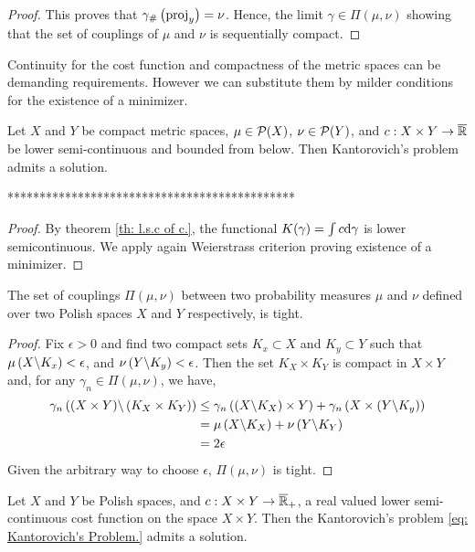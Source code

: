 \begin{theorem}
\begin{proof}
	This proves that ${\gamma}_{\#} \left( \mathrm{proj}_y \right)=\nu$. Hence, the limit $\gamma \in \Pi(\mu, \nu)$ showing that the set of couplings of $\mu$ and $\nu$ is sequentially compact. 
\end{proof}

Continuity for the cost function and compactness of the metric spaces can be demanding requirements. However we can substitute them by milder conditions for the existence of a minimizer. 

\begin{theorem}
	Let $X$ and $Y$ be compact metric spaces, $\mu \in \mathcal{P}(X)$, $\nu \in\mathcal{P}(Y)$, and $c:X\times Y\rightarrow \overline{\mathbb{R}} $  be lower semi-continuous and bounded from below. Then Kantorovich's problem admits a solution.
\end{theorem}
*********************************************
\begin{proof}
By theorem \ref{th: l.s.c of c.}, the functional $K(\gamma) =\int c\mathrm{d}\gamma$ is lower semicontinuous. We apply again Weierstrass criterion proving existence of a minimizer.
\end{proof}


\begin{lemma}
	The set of couplings $\Pi(\mu, \nu)$ between two probability measures $\mu$ and $\nu$ defined over two Polish spaces $X$ and $Y$ respectively, is tight.
\end{lemma}
\begin{proof}
Fix $\epsilon>0$ and find two compact sets $K_x\subset X$ and $K_y\subset Y$ such that $\mu\left( X\backslash K_x \right)<\epsilon$, and $\nu\left( Y\backslash K_y \right)<\epsilon$. Then the set $K_X\times K_Y$ is compact in $X\times Y$ and, for any $\gamma_n\in \Pi(\mu, \nu)$, we have,
\begin{align*}
\gamma_n\left( (X\times Y)\backslash \left( K_X\times K_Y \right) \right)&\leq \gamma_n\left( (X\backslash K_X)\times Y \right)+\gamma_n\left( X\times \left( Y\backslash K_y \right) \right)\\&=\mu\left( X\backslash K_X \right)+\nu\left( Y\backslash K_Y \right)\\&=2\epsilon
\end{align*}  
Given the arbitrary way to choose $\epsilon$, $\Pi(\mu,\nu)$ is tight.
\end{proof}

\begin{theorem}
Let $X$ and $Y$ be Polish spaces, and $c:X\times Y \rightarrow \overline{\mathbb{R}}_+$, a real valued lower semi-continuous cost function on the space $X\times Y$. Then the Kantorovich's problem \eqref{eq: Kantorovich's Problem.} admits a solution.
\end{theorem}


\end{theorem}
